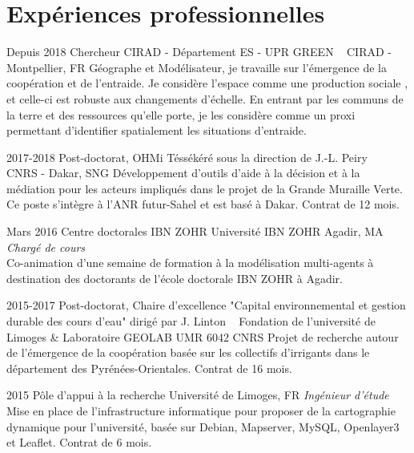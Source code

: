 \documentclass[]{cv-etienne}
\begin{document}
\section{Expériences professionnelles}
\begin{entrylist}
\entry
{Depuis 2018}
{Chercheur CIRAD - Département ES - UPR GREEN ~}
{CIRAD - Montpellier, FR}
{Géographe et Modélisateur, je travaille sur l'émergence de la coopération et de l'entraide. Je considère l'espace comme une production sociale , et celle-ci est robuste aux changements d'échelle. En entrant par les communs de la terre et des ressources qu'elle porte, je les considère comme un proxi permettant d'identifier spatialement les situations d'entraide.}
\end{entrylist}
\begin{entrylist}
\entry
{2017-2018}
{Post-doctorat, OHMi Téssékéré  {\normalfont sous la direction de J.-L. Peiry} ~}
{CNRS - Dakar, SNG}
{Développement d'outils d'aide à la décision et à la médiation pour les acteurs impliqués dans le projet de la Grande Muraille Verte. Ce poste s'intègre à l'ANR futur-Sahel et est basé à Dakar. Contrat de 12 mois.}
\end{entrylist}
\begin{entrylist}
\entry
{Mars 2016}
{Centre doctorales IBN ZOHR}
{Université IBN ZOHR Agadir, MA}
{\emph{Chargé de cours} \\
Co-animation d'une semaine de formation à la modélisation multi-agents à destination des doctorants de l'école doctorale IBN ZOHR à Agadir.
}
\end{entrylist}
\begin{entrylist}
\entry
{2015-2017}
{Post-doctorat, Chaire d'excellence "Capital environnemental et gestion durable des cours d'eau"  {\normalfont dirigé par J. Linton} ~}
{Fondation de l'université de Limoges \& Laboratoire GEOLAB UMR 6042 CNRS}
{Projet de recherche autour de l'émergence de la coopération basée sur les collectifs d'irrigants dans le département des Pyrénées-Orientales. Contrat de 16 mois.}
\end{entrylist}
\begin{entrylist}
\entry
{2015}
{Pôle d'appui à la recherche}
{Université de Limoges, FR}
{\emph{Ingénieur d'étude} \\
Mise en place de l'infrastructure informatique pour proposer de la cartographie dynamique pour l'université, basée sur Debian, Mapserver, MySQL, Openlayer3 et Leaflet. Contrat de 6 mois.
}
\end{entrylist}
\end{document}
